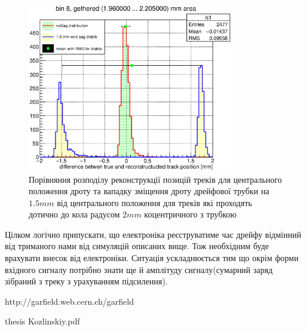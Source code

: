\documentclass[]{article}
\begin{document}
	\begin{figure}[h!]
	\includegraphics[width=0.8\textwidth]{bin8_2mm.eps}
	\centering
	\caption{ Порівняння розподілу реконструкції позицій треків для центрального положення дроту та вападку зміщення дроту дрейфової трубки на $1.5 mm$ від центрального положення для треків які проходять дотично до кола радусом $2mm$  коцентричного з трубкою}
	\end{figure}
	
	Цілком логічно припускати, що електроніка реєструватиме час дрейфу відмінний від триманого нами від симуляцій описаних вище. Тож необхідним буде врахувати внесок від електроніки. Ситуація ускладнюється тим що окрім форми вхідного сигналу потрібно знати ще й амплітуду сигналу(сумарний заряд зібраний з треку з урахуванням підсилення).
	
\newpage
\begin{thebibliography}{00}
	 http://garfield.web.cern.ch/garfield

	  thesis Kozlinskiy.pdf 
	
\end{thebibliography}
	
\end{document}
